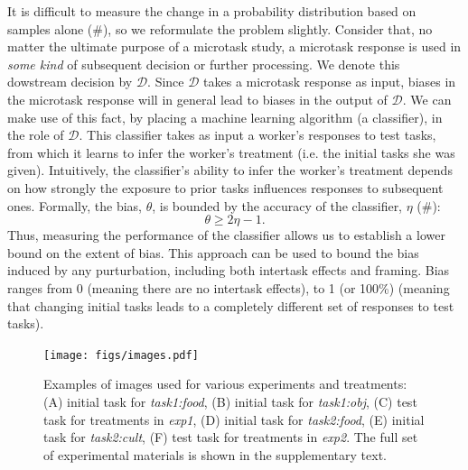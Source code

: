 \documentclass[12pt]{article}
\begin{document}
It is difficult to measure the change in a probability distribution based on
samples alone (\#), so we reformulate the problem slightly. Consider that,  
no matter the ultimate purpose of a microtask study, a microtask response
is used in \textit{some kind} of subsequent decision or 
further processing.
We denote this dowstream decision by $\mathcal{D}$.  Since $\mathcal{D}$
takes a microtask response as input, biases in the microtask response will 
in general lead to biases in the output of $\mathcal{D}$.  
We can make use of this fact, 
by placing a machine learning algorithm (a classifier), in the role of 
$\mathcal{D}$.  This classifier takes as input a worker's responses to test 
tasks, from which it learns to infer the worker's treatment 
(i.e. the initial tasks she was given). 
Intuitively, the classifier's ability to infer the worker's treatment
depends on how strongly the exposure to prior tasks influences responses to 
subsequent ones.  Formally, the bias, $\theta$, is bounded 
by the accuracy of the classifier, $\eta$ (\#):
\begin{equation}
	\theta \geq 2\eta - 1.
	\label{l1}
\end{equation}
Thus, measuring the performance of the classifier allows us to establish a
lower bound on the extent of bias. This approach can be used to bound the 
bias induced by any purturbation, including both intertask effects and 
framing.  Bias ranges from 0 (meaning there are no intertask effects), to 1 
(or 100\%) (meaning that changing initial tasks leads to a completely 
different set of responses to test tasks).

\begin{figure}
	\centering
	\texttt{[image: figs/images.pdf]}
	\caption{
		Examples of images used for various experiments and treatments:
		(A) initial task for \textit{task1:food}, (B) initial task for 
		\textit{task1:obj}, (C) test task for treatments in \textit{exp1}, 
		(D) initial task for \textit{task2:food}, 
		(E) initial task for \textit{task2:cult},  
		(F) test task for treatments in \textit{exp2}.  
		The full set of experimental materials is shown in the 
		supplementary text.
	}

	\label{fig:task}
\end{figure}
\end{document}
